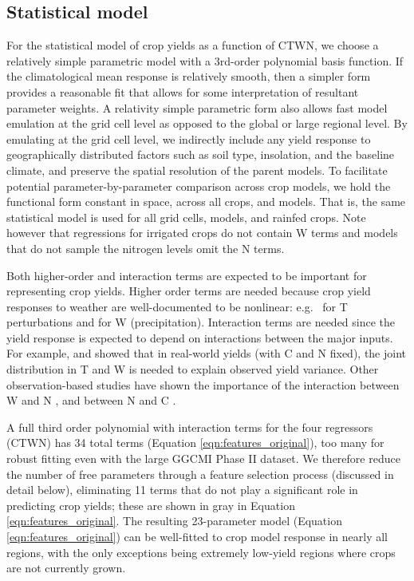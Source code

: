 \documentclass[gmd, manuscript]{copernicus} %
\begin{document}
\subsection{Statistical model}
For the statistical model of crop yields as a function of CTWN, we choose a relatively simple parametric model with a 3rd-order polynomial basis function. 
If the climatological mean response is relatively smooth, then a simpler form provides a reasonable fit that allows for some interpretation of resultant parameter weights. 
A relativity simple parametric form also allows fast model emulation at the grid cell level as opposed to the global or large regional level. 
By emulating at the grid cell level, we indirectly include any yield response to geographically distributed factors such as soil type, insolation, and the baseline climate, and preserve the spatial resolution of the parent models.
To facilitate potential parameter-by-parameter comparison across crop models, we hold the functional form constant in space, across all crops, and models. 
That is, the same statistical model is used for all grid cells, models, and rainfed crops. 
Note however that regressions for irrigated crops do not contain W terms and models that do not sample the nitrogen levels omit the N terms.

Both higher-order and interaction terms are expected to be important for representing crop yields. Higher order terms are needed because crop yield responses to weather are well-documented to be nonlinear: e.g.\ \citet{Schlenker2009} for T perturbations and \citet{He2016} for W (precipitation). 
Interaction terms are needed since the yield response is expected to depend on interactions between the major inputs. 
For example, \citet{Lobell2007} and \citet{Tebaldi2008} showed that in real-world yields (with C and N fixed), the joint distribution in T and W is needed to explain observed yield variance.  
Other observation-based studies have shown the importance of the interaction between W and N \citep[e.g.][]{AULAKH2005}, and between N and C \citep{Mitsuru92, Nakamura97}. 

A full third order polynomial with interaction terms for the four regressors (CTWN) has 34 total terms (Equation \ref{eqn:features_original}), too many for robust fitting even with the large GGCMI Phase II dataset. 
We therefore reduce the number of free parameters through a feature selection process (discussed in detail below), eliminating 11 terms that do not play a significant role in predicting crop yields; these are shown in {\color{dark-gray}gray} in Equation \ref{eqn:features_original}. 
The resulting 23-parameter model (Equation \ref{eqn:features_original}) can be well-fitted to crop model response in nearly all regions, with the only exceptions being extremely low-yield regions where crops are not currently grown.
\end{document}
